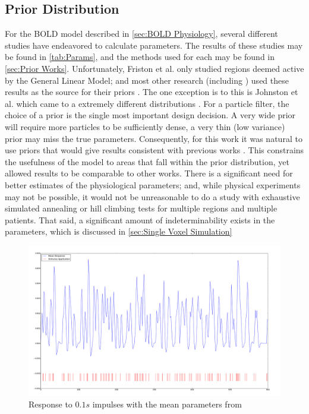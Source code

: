 \subsection{Prior Distribution}
\label{sec:PriorDist}
For the BOLD model described in \autoref{sec:BOLD Physiology}, several
different studies have endeavored to calculate parameters. The results
of these studies may be found in \autoref{tab:Params}, and the methods 
used for each may be found in \autoref{sec:Prior Works}. Unfortunately,
Friston et al. only studied regions deemed active by the General 
Linear Model; and most other research (including \cite{Friston2001}) used these results as 
the source for their priors \cite{Friston2000}. 
The one exception is to this is Johnston et al. which came to a extremely different
distributions \cite{Johnston2008}. For a particle filter, the choice of a prior is
the single most important design decision. A very wide prior will require
more particles to be sufficiently dense, a very thin (low variance) prior may miss
the true parameters. Consequently, for this work it was natural
to use priors that would give results consistent with previous works
\cite{Friston2000}. This constrains the usefulness of the model to
areas that fall within the prior distribution, yet allowed results
to be comparable to other works. There is a significant need for better
estimates of the physiological parameters; and, while physical experiments
may not be possible, it would not be unreasonable to do a study with
exhaustive simulated annealing or hill climbing tests for multiple
regions and multiple patients. That said, a significant amount of
indeterminability exists in the parameters, which is discussed in 
\autoref{sec:Single Voxel Simulation}

\begin{figure}
\centering
\includegraphics[trim=6cm 2cm 6cm 2cm,width=15cm]{images/mean_response}
\caption{Response to $0.1s$ impulses with the mean parameters from \cite{Friston2000}}
\label{fig:MeanResponseF}
\end{figure}

